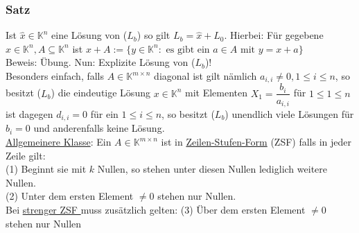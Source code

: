 \subsubsection{Satz}
Ist $\hat{x}\in\mathbb{K}^n$ eine Lösung von ($L_b$) so gilt $L_b=\hat{x}+L_0$.  Hierbei: Für gegebene $x\in\mathbb{K}^n,A\subseteq \mathbb{K}^n$ ist $x+A:=\{y\in \mathbb{K}^n:\text{ es gibt ein }a\in A\text{ mit } y=x+a\}$\\
Beweis: Übung.
Nun: Explizite Lösung von ($L_b$)!\\
Besonders einfach, falls $A\in\mathbb{K}^{m\times n}$ diagonal ist gilt nämlich $a_{i,i}\not=0,1\leq i\leq n$, so besitzt ($L_b$) die eindeutige Lösung $x\in\mathbb{K}^n$ mit Elementen $X_1=\dfrac{b_i}{a_{i,i}}$ für $1\leq 1\leq n$ ist dagegen $d_{i,i}=0$ für ein $1\leq i\leq n$, so besitzt ($L_b$) unendlich viele Lösungen für $b_i=0$ und anderenfalls keine Lösung.\\
\underline{Allgemeinere Klasse}: Ein $A\in \mathbb{K}^{m\times n}$ ist in \underline{Zeilen-Stufen-Form} (ZSF) falls in jeder Zeile gilt:\\
(1) Beginnt sie mit $k$ Nullen, so stehen unter diesen Nullen lediglich weitere Nullen.\\
(2) Unter dem ersten Element $\not= 0$ stehen nur Nullen.\\
Bei \underline{strenger ZSF } muss zusätzlich gelten:
(3) Über dem ersten Element $\not= 0$ stehen nur Nullen\\
